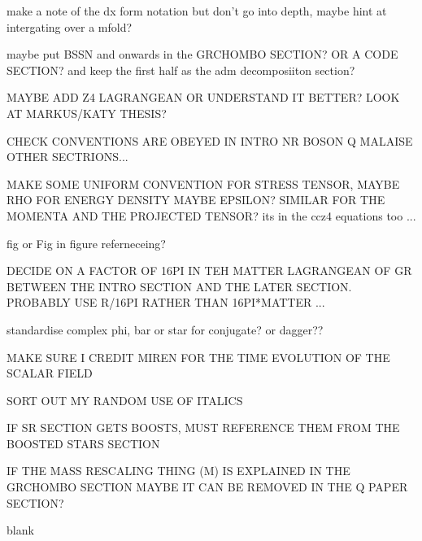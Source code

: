 \documentclass[11pt]{report}  %
\numberwithin{equation}{section}
\begin{document}
make a note of the dx form notation but don't go into depth, maybe hint at intergating over a mfold?

maybe put BSSN and onwards in the GRCHOMBO SECTION? OR A CODE SECTION? and keep the first half as the adm decomposiiton section?

MAYBE ADD Z4 LAGRANGEAN OR UNDERSTAND IT BETTER? LOOK AT MARKUS/KATY THESIS?

CHECK CONVENTIONS ARE OBEYED IN
INTRO
NR
BOSON
Q
MALAISE
OTHER SECTRIONS...

MAKE SOME UNIFORM CONVENTION FOR STRESS TENSOR, MAYBE RHO FOR ENERGY DENSITY MAYBE EPSILON? SIMILAR FOR THE MOMENTA AND THE PROJECTED TENSOR? its in the ccz4 equations too ...

fig or Fig in figure referneceing?

DECIDE ON A FACTOR OF 16PI IN TEH MATTER LAGRANGEAN OF GR BETWEEN THE INTRO SECTION AND THE LATER SECTION. PROBABLY USE R/16PI RATHER THAN 16PI*MATTER ... 

standardise complex phi, bar or star for conjugate? or dagger??

MAKE SURE I CREDIT MIREN FOR THE TIME EVOLUTION OF THE SCALAR FIELD

SORT OUT MY RANDOM USE OF ITALICS

IF SR SECTION GETS BOOSTS, MUST REFERENCE THEM FROM THE BOOSTED STARS SECTION

IF THE MASS RESCALING THING (M) IS EXPLAINED IN THE GRCHOMBO SECTION MAYBE IT CAN BE REMOVED IN THE Q PAPER SECTION?



\begin{thebibliography}{9}

%
%
% 
% 


blank
  \end{thebibliography}



  
\end{document}
